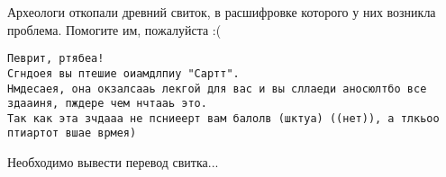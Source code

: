 Археологи откопали древний свиток, в расшифровке которого у них возникла проблема.
Помогите им, пожалуйста :(

\begin{verbatim}
Певрит, ртябеа!
Сгндоея вы птешие оиамдлпиу "Сартт".
Нмдесаея, она окзалсааь лекгой для вас и вы сллаеди аносюлтбо все здааиня, пждере чем нчтааь это.
Так как эта зчдааа не псниеерт вам балолв (шктуа) ((нет)), а тлкьоо птиартот вшае врмея)
\end{verbatim}


\OutputFile

Необходимо вывести перевод свитка...

\SAMPLES
